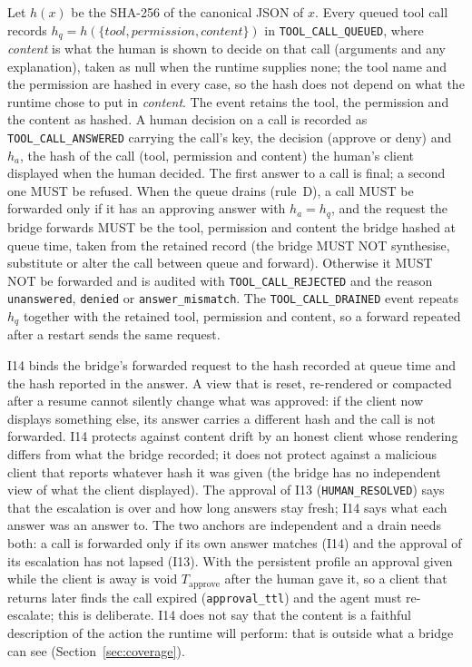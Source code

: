 \begin{invariant}\label{inv:I14}\label{inv:answer_binding}
Let $h(x)$ be the SHA-256 of the canonical JSON of $x$. Every queued tool
call records $h_q = h(\{\mathit{tool}, \mathit{permission},
\mathit{content}\})$ in \texttt{TOOL\_CALL\_QUEUED}, where \emph{content}
is what the human is shown to decide on that call (arguments and any
explanation), taken as null when the runtime supplies none; the tool name
and the permission are hashed in every case, so the hash does not depend on
what the runtime chose to put in \emph{content}. The event retains the
tool, the permission and the content as hashed. A human decision on a call is
recorded as \texttt{TOOL\_CALL\_ANSWERED} carrying the call's key, the
decision (approve or deny) and $h_a$, the hash of the call (tool, permission
and content) the human's client displayed when the human decided. The first answer to a
call is final; a second one MUST be refused. When the queue drains
(rule~D), a call MUST be forwarded only if it has an approving answer
with $h_a = h_q$, and the request the bridge forwards MUST be the tool,
permission and content the bridge hashed at queue time, taken from the
retained record (the bridge MUST NOT synthesise, substitute or alter the
call between queue and forward). Otherwise it MUST NOT be forwarded and is audited with
\texttt{TOOL\_CALL\_REJECTED} and the reason \texttt{unanswered},
\texttt{denied} or \texttt{answer\_mismatch}. The
\texttt{TOOL\_CALL\_DRAINED} event repeats $h_q$ together with the
retained tool, permission and content, so a forward repeated after a restart
sends the same request.
\end{invariant}

I14 binds the bridge's forwarded request to the hash recorded at
queue time and the hash reported in the answer. A view
that is reset, re-rendered or compacted after a resume cannot silently
change what was approved: if the client now displays something else, its
answer carries a different hash and the call is not forwarded. I14
protects against content drift by an honest client whose rendering
differs from what the bridge recorded; it does not protect against a
malicious client that reports whatever hash it was given (the bridge has
no independent view of what the client displayed). The
approval of I13 (\texttt{HUMAN\_RESOLVED}) says that the escalation is
over and how long answers stay fresh; I14 says what each answer was an
answer to. The two anchors are independent and a drain needs both: a call
is forwarded only if its own answer matches (I14) and the approval of its
escalation has not lapsed (I13). With the persistent profile an approval
given while the client is away is void $T_{\text{approve}}$ after the
human gave it, so a client that returns later finds the call expired
(\texttt{approval\_ttl}) and the agent must re-escalate; this is
deliberate. I14 does not say that the content is a faithful description
of the action the runtime will perform: that is outside what a bridge can
see (Section~\ref{sec:coverage}).

